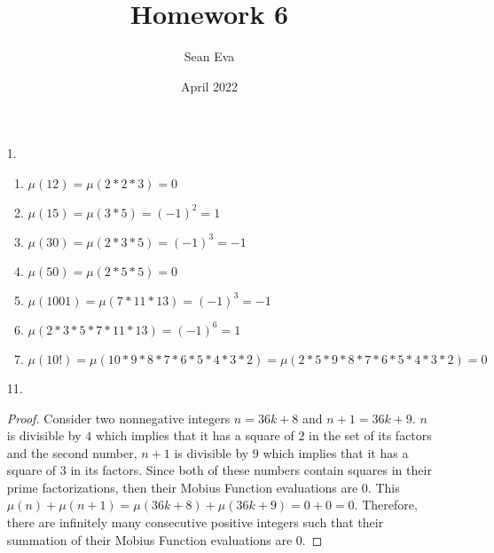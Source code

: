 \documentclass{article}
\title{Homework 6}
\author{Sean Eva}
\date{April 2022}
\theoremstyle{definition}
\begin{document}
\maketitle

\begin{enumerate}
    \item [1. ]
    
    \begin{enumerate}
        \item 
        
        $\mu(12) = \mu(2*2*3) = 0$
        
        \item
        
        $\mu(15) = \mu(3*5) = (-1)^2 = 1$
        
        \item
        
        $\mu(30) = \mu(2*3*5) = (-1)^3 = -1$
        
        \item
        
        $\mu(50) = \mu(2*5*5) = 0$
        
        \item
        
        $\mu(1001) = \mu(7*11*13) = (-1)^3 = -1$
        
        \item
        
        $\mu(2*3*5*7*11*13) = (-1)^6 = 1$
        
        \item
        
        $\mu(10!) = \mu(10*9*8*7*6*5*4*3*2) = \mu(2*5*9*8*7*6*5*4*3*2) = 0$
        
    \end{enumerate}
    
    \item [11. ]
    
    \begin{proof}
    Consider two nonnegative integers $n = 36k + 8$ and $n + 1 = 36k + 9$. $n$ is divisible by $4$ which implies that it has a square of $2$ in the set of its factors and the second number, $n + 1$ is divisible by $9$ which implies that it has a square of $3$ in its factors. Since both of these numbers contain squares in their prime factorizations, then their Mobius Function evaluations are $0.$ This $\mu(n) + \mu(n + 1) = \mu(36k + 8) + \mu(36k + 9) = 0 + 0 = 0.$ Therefore, there are infinitely many consecutive positive integers such that their summation of their Mobius Function evaluations are 0.
    \end{proof}
    

\end{enumerate}
\end{document}

